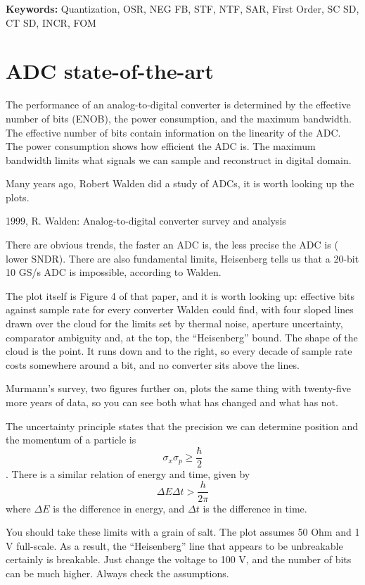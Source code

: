 \textbf{Keywords:} Quantization, OSR, NEG FB, STF, NTF, SAR, First
Order, SC SD, CT SD, INCR, FOM

\section{ADC state-of-the-art}\label{adc-state-of-the-art}

The performance of an analog-to-digital converter is determined by the
effective number of bits (ENOB), the power consumption, and the maximum
bandwidth. The effective number of bits contain information on the
linearity of the ADC. The power consumption shows how efficient the ADC
is. The maximum bandwidth limits what signals we can sample and
reconstruct in digital domain.

Many years ago, Robert Walden did a study of ADCs, it is worth looking
up the plots.

1999, R. Walden: Analog-to-digital converter survey and analysis

There are obvious trends, the faster an ADC is, the less precise the ADC
is ( lower SNDR). There are also fundamental limits, Heisenberg tells us
that a 20-bit 10 GS/s ADC is impossible, according to Walden.

The plot itself is Figure 4 of that paper, and it is worth looking up:
effective bits against sample rate for every converter Walden could
find, with four sloped lines drawn over the cloud for the limits set by
thermal noise, aperture uncertainty, comparator ambiguity and, at the
top, the ``Heisenberg'' bound. The shape of the cloud is the point. It
runs down and to the right, so every decade of sample rate costs
somewhere around a bit, and no converter sits above the lines.

Murmann's survey, two figures further on, plots the same thing with
twenty-five more years of data, so you can see both what has changed and
what has not.

The uncertainty principle states that the precision we can determine
position and the momentum of a particle is
\[\sigma_x \sigma_p \ge \frac{\hbar}{2}\]. There is a similar relation
of energy and time, given by \[\Delta E \Delta t > \frac{h}{2 \pi}\]
where \(\Delta E\) is the difference in energy, and \(\Delta t\) is the
difference in time.

You should take these limits with a grain of salt. The plot assumes 50
Ohm and 1 V full-scale. As a result, the ``Heisenberg'' line that
appears to be unbreakable certainly is breakable. Just change the
voltage to 100 V, and the number of bits can be much higher. Always
check the assumptions.


